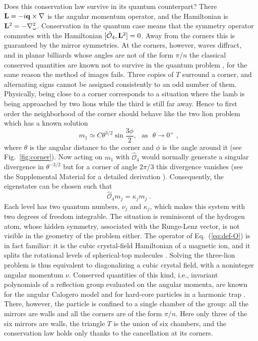 \documentclass[aps,prl,twocolumn,superscriptaddress,floatfix,nofootinbib]{revtex4-2}
\begin{document}
Does this conservation law survive in its quantum counterpart? There $\vb{L} = - i \vb{q} \times \nabla$ is the angular momentum operator, and the Hamiltonian is $\vb{L}^2 = - \laplacian_\omega$. Conservation in the quantum case means that the symmetry operator commutes with the Hamiltonian $[\hat{\mathcal{O}}_4, \vb{L}^2] = 0$. Away from the corners this is guaranteed by the mirror symmetries. At the corners, however, waves diffract, and in planar billiards whose angles are not of the form $\pi/n$ the classical conserved quantities are known not to survive in the quantum problem \cite{RB81,KGW24}, for the same reason the method of images fails. Three copies of $T$ surround a corner, and alternating signs cannot be assigned consistently to an odd number of them. Physically, being close to a corner corresponds to a situation where the lamb is being approached by two lions while the third is still far away. Hence to first order the neighborhood of the corner should behave like the two lion problem which has a known solution
\begin{equation} \label{eq:ground-vertex}
    m_1 \simeq C \theta^{3/2} \sin \frac{3 \phi}{2}, \mbox{~~as~~} \theta \to 0^+ \;,
\end{equation}
where $\theta$ is the angular distance to the corner and $\phi$ is the angle around it (see Fig.~\ref{fig:corner}). Now acting on $m_1$ with $\hat{\mathcal{O}}_4$ would normally generate a singular divergence in $\theta^{-3/2}$ but for a corner of angle $2 \pi / 3$ this divergence vanishes (see the Supplemental Material for a detailed derivation \cite{SM}). Consequently, the eigenstates can be chosen such that
\begin{equation} \label{eq:O4-eigen}
    \hat{\mathcal{O}}_4 m_j = \kappa_j m_j \;.
\end{equation}
Each level has two quantum numbers, $\nu_j$ and $\kappa_j$, which makes this system with two degrees of freedom integrable. The situation is reminiscent of the hydrogen atom, whose hidden symmetry, associated with the Runge-Lenz vector, is not visible in the geometry of the problem either. The operator of Eq.~(\ref{eq:def-O}) is in fact familiar: it is the cubic crystal-field Hamiltonian of a magnetic ion, and it splits the rotational levels of spherical-top molecules \cite{LLW62,AB70,Hecht61}. Solving the three-lion problem is thus equivalent to diagonalizing a cubic crystal field, with a noninteger angular momentum $\nu$. Conserved quantities of this kind, i.e., invariant polynomials of a reflection group evaluated on the angular momenta, are known for the angular Calogero model \cite{CL15} and for hard-core particles in a harmonic trap \cite{HODVJZ17}. There, however, the particle is confined to a single chamber of the group: all the mirrors are walls and all the corners are of the form $\pi/n$. Here only three of the six mirrors are walls, the triangle $T$ is the union of six chambers, and the conservation law holds only thanks to the cancellation at its corners.
\end{document}
